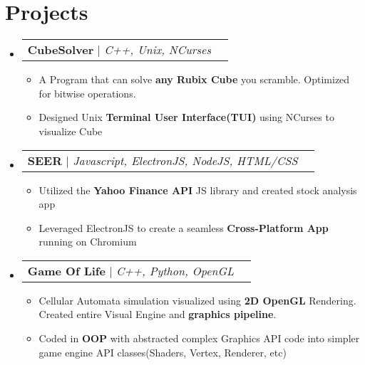 \documentclass[letterpaper,11pt]{article}
\makeatletter
\newcommand{\resumeItem}[1]{
  \item\small{
    {#1 \vspace{-2pt}}
  }
}
\newcommand{\resumeProjectHeading}[2]{
    \item
    \begin{tabular*}{0.97\textwidth}{l@{\extracolsep{\fill}}r}
      \small#1 & #2 \\
    \end{tabular*}\vspace{-7pt}
}
\newcommand{\resumeSubHeadingListStart}{\begin{itemize}[leftmargin=0.15in, label={}]}
\newcommand{\resumeSubHeadingListEnd}{\end{itemize}}
\newcommand{\resumeItemListStart}{\begin{itemize}}
\newcommand{\resumeItemListEnd}{\end{itemize}\vspace{-5pt}}
\makeatother
\begin{document}
\section{Projects}
    \resumeSubHeadingListStart
      \resumeProjectHeading
      {\textbf{CubeSolver} $|$ \emph{C++, Unix, NCurses}}{}
        \resumeItemListStart
        \resumeItem{A Program that can solve \textbf{any Rubix Cube} you scramble. Optimized for bitwise operations.}
        \resumeItem{Designed Unix \textbf{Terminal User Interface(TUI)} using NCurses to visualize Cube}
      \resumeItemListEnd
      \resumeProjectHeading
        {\textbf{SEER} $|$ \emph{Javascript, ElectronJS, NodeJS, HTML/CSS}}{}
          \resumeItemListStart
          \resumeItem {Utilized the \textbf{Yahoo Finance API} JS library and created stock analysis app}
          \resumeItem{Leveraged ElectronJS to create a seamless \textbf{Cross-Platform App} running on Chromium}
          \resumeItemListEnd
         
      \resumeProjectHeading
         {\textbf{Game Of Life} $|$ \emph{C++, Python, OpenGL}}{}
          \resumeItemListStart
            \resumeItem{ Cellular Automata simulation visualized using \textbf{2D OpenGL} Rendering. Created entire Visual Engine and \textbf{graphics pipeline}.}
            \resumeItem {Coded in \textbf{OOP} with abstracted complex Graphics API code into simpler {game engine API} classes(Shaders, Vertex, Renderer, etc)}
          \resumeItemListEnd
    \resumeSubHeadingListEnd
\end{document}
